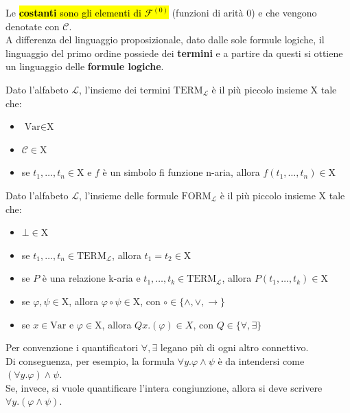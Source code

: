 \documentclass[a4paper, 12pt]{book}
\newcommand{\definizione}[2]{%
\vspace{15pt}%
\begin{tcolorbox}[
  colback=cyan!5!white,
  colframe=blue!50!black,
  title=\textbf{Definizione: #1}, %
  coltitle=white,
  fonttitle=\bfseries,
  arc=3mm,
  boxrule=0.5pt,
  enhanced,
  breakable
]
#2 %
\end{tcolorbox}
\vspace{15pt}%
}
\begin{document}
Le \hl{\textbf{costanti} sono gli elementi di $\mathcal{F}^{(0)}$} (funzioni di arità 0) e che vengono denotate con $\mathcal{C}$. \\[0.4ex]

A differenza del linguaggio proposizionale, dato dalle sole formule logiche, il linguaggio del primo ordine possiede dei \textbf{termini} e a partire da questi si ottiene un linguaggio delle \textbf{formule logiche}.

\definizione{$\mathcal{L}$-termini}{Dato l'alfabeto $\mathcal{L}$, l'insieme dei termini $\text{TERM}_{\mathcal{L}}$ è il più piccolo insieme X tale che:
\begin{itemize}
  \item $\text{Var} \in \text{X}$
  \item $\mathcal{C} \in \text{X}$
  \item se $t_1, \dots, t_n \in \text{X}$ e $f$ è un simbolo fi funzione n-aria, allora $f(t_1, \dots, t_n) \in \text{X}$
\end{itemize}}

\definizione{$\mathcal{L}$-formule}{Dato l'alfabeto $\mathcal{L}$, l'insieme delle formule $\text{FORM}_{\mathcal{L}}$ è il più piccolo insieme X tale che:
\begin{itemize}
  \item $\bot \in \text{X}$
  \item se $t_1, \dots, t_n \in \text{TERM}_{\mathcal{L}}$, allora $t_1 = t_2 \in \text{X}$
  \item se $P$ è una relazione k-aria e $t_1, \dots, t_k \in \text{TERM}_{\mathcal{L}}$, allora $P(t_1, \dots, t_k) \in \text{X}$
  \item se $\varphi, \psi \in \text{X}$, allora $\varphi \circ \psi \in \text{X}$, con $\circ \in \{\land, \lor, \rightarrow\}$
  \item se $x \in \text{Var}$ e $\varphi \in \text{X}$, allora $Qx.(\varphi) \in X$, con $Q \in \{\forall, \exists\}$
\end{itemize}}

Per convenzione i quantificatori $\forall, \exists$ legano più di ogni altro connettivo. \\[0.2ex]
Di conseguenza, per esempio, la formula $\forall y. \varphi \land \psi$ è da intendersi come $(\forall y. \varphi) \land \psi$. \\[0.2ex]
Se, invece, si vuole quantificare l'intera congiunzione, allora si deve scrivere $\forall y. (\varphi \land \psi)$.
\end{document}
